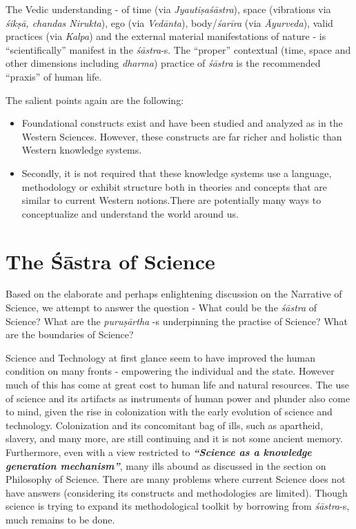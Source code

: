 The Vedic understanding - of time (via \textit{Jyautiṣaśāstra}), space (vibrations via \textit{śikṣā, chandas Nirukta}), ego (via \textit{Vedānta}), body/\textit{śarīra} (via \textit{Āyurveda}), valid practices (via \textit{Kalpa}) and the external material manifestations of nature - is “scientifically” manifest in the \textit{śāstra}-s. The “proper” contextual (time, space and other dimensions including \textit{dharma}) practice of \textit{śāstra} is the recommended “praxis” of human life.

The salient points again are the following:

\begin{itemize}
\item Foundational constructs exist and have been studied and analyzed as in the Western Sciences. However, these constructs are far richer and holistic than Western knowledge systems.

 \item Secondly, it is not required that these knowledge systems use a language, methodology or exhibit structure both in theories and concepts that are similar to current Western notions.There are potentially many ways to conceptualize and understand the world around us.

\end{itemize}


\section*{The Śāstra of Science}

Based on the elaborate and perhaps enlightening discussion on the Narrative of Science, we attempt to answer the question - What could be the \textit{śāstra} of Science? What are the \textit{puruṣārtha} -s underpinning the practise of Science? What are the boundaries of Science?

Science and Technology at first glance seem to have improved the human condition on many fronts - empowering the individual and the state. However much of this has come at great cost to human life and natural resources. The use of science and its artifacts as instruments of human power and plunder also come to mind, given the rise in colonization with the early evolution of science and technology. Colonization and its concomitant bag of ills, such as apartheid, slavery, and many more, are still continuing and it is not some ancient memory. Furthermore, even with a view restricted to \textbf{\textit{“Science as a knowledge generation mechanism”}}, many ills abound as discussed in the section on Philosophy of Science. There are many problems where current Science does not have answers (considering its constructs and methodologies are limited). Though science is trying to expand its methodological toolkit by borrowing from \textit{śāstra}-s, much remains to be done.

